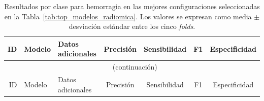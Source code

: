 \begin{landscape}
\begingroup
\scriptsize
\setlength{\tabcolsep}{3pt}

\begin{longtable}{rllcccc}
\caption{Resultados por clase para hemorragia en las mejores configuraciones seleccionadas en la Tabla~\ref{tab:top_modelos_radiomica}. Los valores se expresan como media $\pm$ desviación estándar entre los cinco \textit{folds}.}
\label{tab:radiomica_hemorragia}\\
\toprule
ID & Modelo & Datos adicionales & Precisión & Sensibilidad & F1 & Especificidad \\
\midrule
\endfirsthead

\multicolumn{7}{c}{\tablename\ \thetable{} (continuación)} \\
\toprule
ID & Modelo & Datos adicionales & Precisión & Sensibilidad & F1 & Especificidad \\
\midrule
\endhead


\end{longtable}
\end{landscape}
